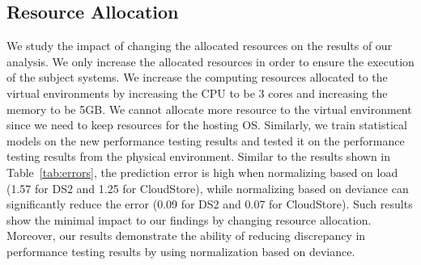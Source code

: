 \begin{comment}
\begin{table}[tbh]
	\centering
	\caption{Discrepancy vs. Change in Virtual Environment}
	\label{my-label}
	\resizebox{\columnwidth}{!}{%
		\begin{tabular}{|c||c|c|}
			\hline
			\multirow{2}{*}{\textbf{Type}} & \multicolumn{2}{c|}{\textbf{MAPE}} \\ \cline{2-3} 
			& \textbf{CloudStore} & \textbf{DS2} \\ %
			\midrule
			\midrule
			Internal validation & 3.65\% & 10.52\% \\ \hline
			External validation with virtual repeated test \# 1 & 6.04\% & 11.69\% \\ \hline
			External validation with virtual repeated test \# 2 & 5.43\% & 15.48\% \\ \hline
			VMWare & 10.18\% & 12.89\% \\ \hline
			Change in resources & 25.81\% & 84.36\% \\ \hline
		\end{tabular}%
	}
\end{table}
\end{comment}


\subsection{Resource Allocation}

We study the impact of changing the allocated resources on the results of our analysis. We only increase the allocated resources in order to ensure the execution of the subject systems. We increase the computing resources allocated to the virtual environments by increasing the CPU to be 3 cores and increasing the memory to be 5GB. We cannot allocate more resource to the virtual environment since we need to keep resources for the hosting OS. Similarly, we train statistical models on the new performance testing results and tested it on the performance testing results from the physical environment. Similar to the results shown in Table~\ref{tab:errors}, the prediction error is high when normalizing based on load (1.57 for DS2 and 1.25 for CloudStore), while normalizing based on deviance can significantly reduce the error (0.09 for DS2 and 0.07 for CloudStore). Such results show the minimal impact to our findings by changing resource allocation. Moreover, our results demonstrate the ability of reducing discrepancy in performance testing results by using normalization based on deviance. 

